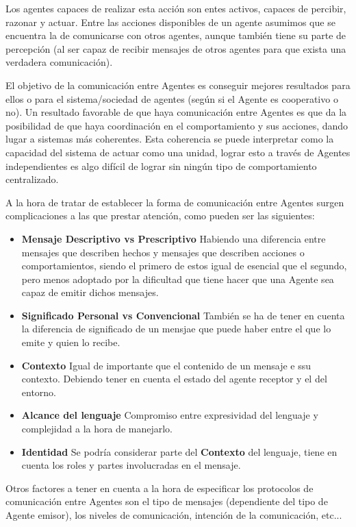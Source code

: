 Los agentes capaces de realizar esta acción son entes activos, capaces de percibir, razonar y actuar. Entre las acciones disponibles de un agente asumimos que se encuentra la de comunicarse con otros agentes, aunque también tiene su parte de percepción (al ser capaz de recibir mensajes de otros agentes para que exista una verdadera comunicación).

El objetivo de la comunicación entre Agentes es conseguir mejores resultados para ellos o para el sistema/sociedad de agentes (según si el Agente es cooperativo o no). Un resultado favorable de que haya comunicación entre Agentes es que da la posibilidad de que haya coordinación en el comportamiento y sus acciones, dando lugar a sistemas más coherentes. Esta coherencia se puede interpretar como la capacidad del sistema de actuar como una unidad, lograr esto a través de Agentes independientes es algo difícil de lograr sin ningún tipo de comportamiento centralizado. 

A la hora de tratar de establecer la forma de comunicación entre Agentes surgen complicaciones a las que prestar atención, como pueden ser las siguientes:

\begin{itemize}
	\item\textbf{Mensaje Descriptivo vs Prescriptivo} Habiendo una diferencia entre mensajes que describen hechos y mensajes que describen acciones o comportamientos, siendo el primero de estos igual de esencial que el segundo, pero menos adoptado por la dificultad que tiene hacer que una Agente sea capaz de emitir dichos mensajes.
	\item\textbf{Significado Personal vs Convencional} También se ha de tener en cuenta la diferencia de significado de un mensjae que puede haber entre el que lo emite y quien lo recibe.
	\item\textbf{Contexto} Igual de importante que el contenido de un mensaje e ssu contexto. Debiendo tener en cuenta el estado del agente receptor y el del entorno.
	\item\textbf{Alcance del lenguaje} Compromiso entre expresividad del lenguaje y complejidad a la hora de manejarlo.
	\item\textbf{Identidad} Se podría considerar parte del \textbf{Contexto} del lenguaje, tiene en cuenta los roles y partes involucradas en el mensaje.
\end{itemize}

Otros factores a tener en cuenta a la hora de especificar los protocolos de comunicación entre Agentes son el tipo de mensajes (dependiente del tipo de Agente emisor), los niveles de comunicación, intención de la comunicación, etc... 


